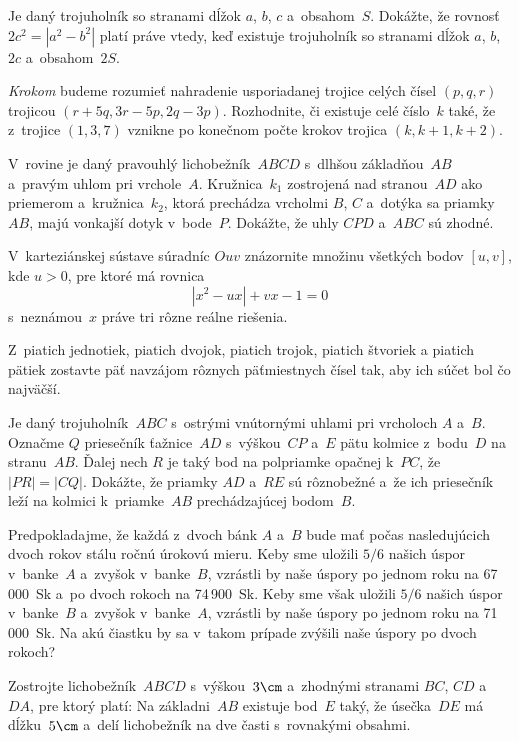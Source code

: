 {%
Je daný trojuholník so stranami dĺžok $a$, $b$, $c$ a~obsahom~$S$. Dokážte, že rovnosť $2c^2=|a^2-b^2|$ platí práve vtedy, keď existuje trojuholník so stranami dĺžok $a$, $b$, $2c$ a~obsahom~$2S$.}

{%
{\it Krokom} budeme rozumieť nahradenie usporiadanej trojice celých čísel $(p,q,r)$ trojicou $(r+5q,3r-5p,2q-3p)$. Rozhodnite, či existuje celé číslo~$k$ také, že z~trojice $(1,3,7)$ vznikne po konečnom počte krokov trojica $(k,k+1,k+2)$.}

{%
V~rovine je daný pravouhlý lichobežník~$ABCD$ s~dlhšou základňou~$AB$ a~pravým uhlom pri vrchole~$A$. Kružnica~$k_1$ zostrojená nad stranou~$AD$ ako priemerom a~kružnica~$k_2$, ktorá prechádza vrcholmi $B$, $C$ a~dotýka sa priamky~$AB$, majú vonkajší dotyk v~bode~$P$. Dokážte, že uhly $CPD$ a~$ABC$ sú zhodné.}

{%
V~karteziánskej sústave súradníc $Ouv$ znázornite množinu všetkých bodov $[u,v]$, kde $u>0$, pre ktoré má rovnica
$$
|x^2-ux|+vx-1=0
$$
s~neznámou~$x$ práve tri rôzne reálne riešenia.}

{%
Z~piatich jednotiek, piatich dvojok, piatich trojok, piatich štvoriek a piatich pätiek zostavte päť navzájom rôznych päťmiestnych čísel tak, aby ich súčet bol čo najväčší.}

{%
Je daný trojuholník~$ABC$ s~ostrými vnútornými uhlami pri vrcholoch $A$ a~$B$. Označme $Q$ priesečník ťažnice~$AD$ s~výškou~$CP$ a~$E$ pätu kolmice z~bodu~$D$ na stranu~$AB$. Ďalej nech $R$ je taký bod na polpriamke opačnej k~$PC$, že $|PR| = |CQ|$. Dokážte, že priamky $AD$ a~$RE$ sú rôznobežné a~že ich priesečník leží na kolmici k~priamke~$AB$ prechádzajúcej bodom~$B$.}

{%
Predpokladajme, že každá z~dvoch bánk $A$ a~$B$ bude mať počas nasledujúcich dvoch rokov stálu ročnú úrokovú mieru. Keby sme uložili $5/6$ našich úspor v~banke~$A$ a~zvyšok v~banke~$B$, vzrástli by naše úspory po jednom roku na 67\,000~Sk a~po dvoch rokoch na 74\,900~Sk. Keby sme však uložili $5/6$ našich úspor v~banke~$B$ a~zvyšok v~banke~$A$, vzrástli by naše úspory po jednom roku na 71\,000~Sk. Na akú čiastku by sa v~takom prípade zvýšili naše úspory po dvoch rokoch?}

{%
Zostrojte lichobežník~$ABCD$ s~výškou~$3\cm$ a~zhodnými stranami $BC$, $CD$ a~$DA$, pre ktorý platí: Na základni~$AB$ existuje bod~$E$ taký, že úsečka~$DE$ má dĺžku~$5\cm$ a~delí lichobežník na dve časti s~rovnakými obsahmi.}

